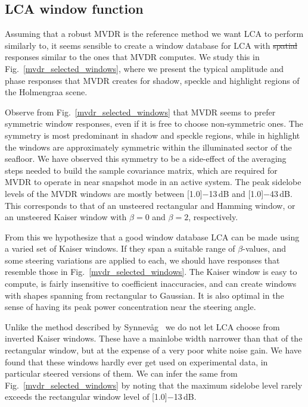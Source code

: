 \documentclass[10pt,journal,draftclsnofoot,onecolumn]{IEEEtran}
\newcommand\Fig[1]{Fig.~\ref{#1}}
\newcommand\1{\vec 1}
\newcommand\minus{\scalebox{0.75}[1.0]{$-$}}
\providecommand{\DIFadd}[1]{{\protect\color{blue}\uwave{#1}}} %
\providecommand{\DIFdel}[1]{{\protect\color{red}\sout{#1}}}                      %
\providecommand{\DIFaddbegin}{} %
\providecommand{\DIFaddend}{} %
\providecommand{\DIFdelbegin}{} %
\providecommand{\DIFdelend}{} %
\begin{document}
\subsection{LCA window function}\label{sec:results_lca_window_function}

Assuming that a robust MVDR is the reference method we want LCA to perform similarly to, it seems sensible to create a window database for LCA with \DIFdelbegin \DIFdel{spatial }\DIFdelend \DIFaddbegin \DIFadd{with }\DIFaddend responses similar to the ones that MVDR computes. We study this in \Fig{mvdr_selected_windows}, where we present the typical amplitude and phase responses that MVDR creates for shadow, speckle and highlight regions of the Holmengraa scene.

Observe from \Fig{mvdr_selected_windows} that MVDR seems to prefer symmetric window responses, even if it is free to choose non-symmetric ones. The symmetry is most predominant in shadow and speckle regions, while in highlight the windows are approximately symmetric within the illuminated sector of the seafloor. We have observed this symmetry to be a side-effect of the averaging steps needed to build the sample covariance matrix, which are required for MVDR to operate in near snapshot mode in an active system. The peak sidelobe levels of the MVDR windows are mostly between \minus{}13\,dB and \minus{}43\,dB. This corresponds to that of an unsteered rectangular and Hamming window, or an unsteered Kaiser window with $\beta=0$ and $\beta=2$, respectively.

From this we hypothesize that a good window database LCA can be made using a varied  set of Kaiser windows. If they span a suitable range of $\beta$-values, and some steering variations are applied to each, we should have responses that resemble those in \Fig{mvdr_selected_windows}. The Kaiser window is easy to compute, is fairly insensitive to coefficient inaccuracies, and can create windows with shapes spanning from rectangular to Gaussian. It is also optimal in the sense of having its peak power concentration near the steering angle.

Unlike the method described by Synnev\aa{}g~\cite{Synnevag2008} we do not let LCA choose from inverted Kaiser windows. These have a mainlobe width narrower than that of the rectangular window, but at the expense of a very poor white noise gain. We have found that these windows hardly ever get used on experimental data, in particular steered versions of them. We can infer the same from \Fig{mvdr_selected_windows} by noting that the maximum sidelobe level rarely exceeds the rectangular window level of \minus{}13\,dB.
\end{document}
